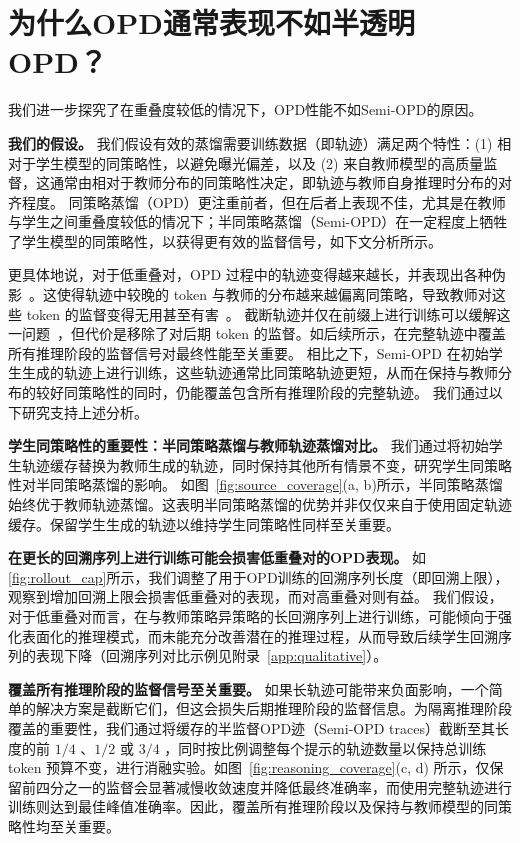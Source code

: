 \vspace{-0.5em}
\section{为什么OPD通常表现不如半透明OPD？}
\vspace{-0.5em}
\label{sec:why}

我们进一步探究了在重叠度较低的情况下，OPD性能不如Semi-OPD的原因。

\noindent \textbf{我们的假设。}
我们假设有效的蒸馏需要训练数据（即轨迹）满足两个特性：(1) 相对于学生模型的同策略性，以避免曝光偏差，以及 (2) 来自教师模型的高质量监督，这通常由相对于教师分布的同策略性决定，即轨迹与教师自身推理时分布的对齐程度。
同策略蒸馏（OPD）更注重前者，但在后者上表现不佳，尤其是在教师与学生之间重叠度较低的情况下；半同策略蒸馏（Semi-OPD）在一定程度上牺牲了学生模型的同策略性，以获得更有效的监督信号，如下文分析所示。

更具体地说，对于低重叠对，OPD 过程中的轨迹变得越来越长，并表现出各种伪影~\citep{luo2026demystifying, yang2026eos, fu2026revisiting}。这使得轨迹中较晚的 token 与教师的分布越来越偏离同策略，导致教师对这些 token 的监督变得无用甚至有害~\citep{xu2026pass,jiang2026trajectory}。  
截断轨迹并仅在前缀上进行训练可以缓解这一问题~\citep{zhang2026fast,ziheng2026less}，但代价是移除了对后期 token 的监督。如后续所示，在完整轨迹中覆盖所有推理阶段的监督信号对最终性能至关重要。  
相比之下，Semi-OPD 在初始学生生成的轨迹上进行训练，这些轨迹通常比同策略轨迹更短，从而在保持与教师分布的较好同策略性的同时，仍能覆盖包含所有推理阶段的完整轨迹。  
我们通过以下研究支持上述分析。


\noindent \textbf{学生同策略性的重要性：半同策略蒸馏与教师轨迹蒸馏对比。}
我们通过将初始学生轨迹缓存替换为教师生成的轨迹，同时保持其他所有情景不变，研究学生同策略性对半同策略蒸馏的影响。
如图~\ref{fig:source_coverage}(a, b)所示，半同策略蒸馏始终优于教师轨迹蒸馏。这表明半同策略蒸馏的优势并非仅仅来自于使用固定轨迹缓存。保留学生生成的轨迹以维持学生同策略性同样至关重要。




\noindent \textbf{在更长的回溯序列上进行训练可能会损害低重叠对的OPD表现。}  
如\cref{fig:rollout_cap}所示，我们调整了用于OPD训练的回溯序列长度（即回溯上限），观察到增加回溯上限会损害低重叠对的表现，而对高重叠对则有益。  
我们假设，对于低重叠对而言，在与教师策略异策略的长回溯序列上进行训练，可能倾向于强化表面化的推理模式，而未能充分改善潜在的推理过程，从而导致后续学生回溯序列的表现下降（回溯序列对比示例见附录~\ref{app:qualitative}）。


\noindent \textbf{覆盖所有推理阶段的监督信号至关重要。}  
如果长轨迹可能带来负面影响，一个简单的解决方案是截断它们，但这会损失后期推理阶段的监督信息。为隔离推理阶段覆盖的重要性，我们通过将缓存的半监督OPD迹（Semi-OPD traces）截断至其长度的前 $1/4$ 、$1/2$ 或 $3/4$ ，同时按比例调整每个提示的轨迹数量以保持总训练 token 预算不变，进行消融实验。如图~\ref{fig:reasoning_coverage}(c, d) 所示，仅保留前四分之一的监督会显著减慢收敛速度并降低最终准确率，而使用完整轨迹进行训练则达到最佳峰值准确率。因此，覆盖所有推理阶段以及保持与教师模型的同策略性均至关重要。




